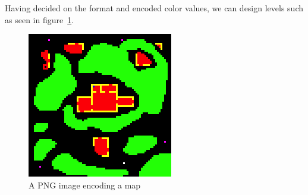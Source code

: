Having decided on the format and encoded color values, we can design levels
such as seen in figure~\ref{fig:png_map}.

\begin{figure}[H]
    \centering
    \includegraphics{figures/generating_levels/map.png}
    \caption{A PNG image encoding a map}\label{fig:png_map}
\end{figure}

